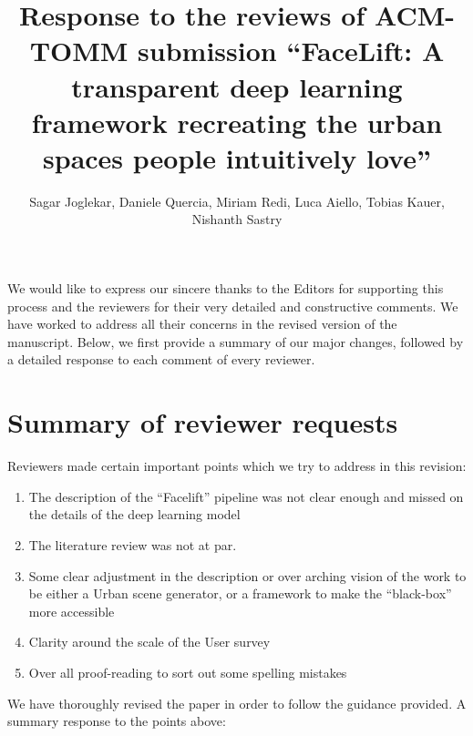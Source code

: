 \documentclass{paper}
\newenvironment{myquote}
{\definecolor{shadecolor}{rgb}{0.9,0.95,1} \begin{shaded*} \sf \em}
{\em\end{shaded*}}
\newenvironment{myquoteOrange}
{\definecolor{shadecolor}{rgb}{1,0.9,0.83} \begin{shaded*} \sf \em}
{\em\end{shaded*}}
\begin{document}


\title{Response to the reviews of ACM-TOMM submission ``FaceLift: A transparent deep learning framework recreating the urban spaces people intuitively love''}
\author{\small Sagar Joglekar, Daniele Quercia, Miriam Redi, Luca Aiello, Tobias Kauer, Nishanth Sastry}
\maketitle

We would like to express our sincere thanks to the Editors for supporting this process and the reviewers for their very detailed and constructive comments. We have worked to address all their concerns in the revised version of the manuscript. Below, we first provide a summary of our major changes, followed by a detailed response to each comment of every reviewer.

\section*{Summary of reviewer requests}

\begin{myquote}

\noindent Reviewers made certain important points which we try to address in this revision:

\begin{enumerate}
\item The description of the ``Facelift'' pipeline was not clear enough and missed on the details of the deep learning model
\item The literature review was not at par. 
\item Some clear adjustment in the description or over arching vision of the work to be either a Urban scene generator, or a framework to make the ``black-box'' more accessible
\item Clarity around the scale of the User survey
\item Over all proof-reading to sort out some spelling mistakes
\end{enumerate}

\end{myquote}

\noindent We have thoroughly revised the paper in order to follow the guidance provided. A summary response to the points above:
\end{document}
